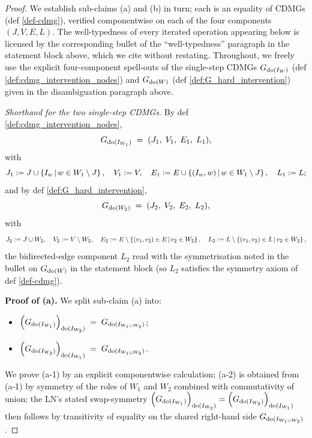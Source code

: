 \documentclass[main]{subfiles}
\begin{document}
\begin{proof}
We establish sub-claims (a) and (b) in turn; each is an equality of CDMGs (def \ref{def-cdmg}), verified componentwise on each of the four components $(J, V, E, L)$. The well-typedness of every iterated operation appearing below is licensed by the corresponding bullet of the ``well-typedness'' paragraph in the statement block above, which we cite without restating. Throughout, we freely use the explicit four-component spell-outs of the single-step CDMGs $G_{\operatorname{do}(I_W)}$ (def \ref{def:cdmg_intervention_nodes}) and $G_{\operatorname{do}(W)}$ (def \ref{def:G_hard_intervention}) given in the disambiguation paragraph above.

\smallskip\noindent\emph{Shorthand for the two single-step CDMGs.}
By def \ref{def:cdmg_intervention_nodes},
\[
    G_{\operatorname{do}(I_{W_1})} \;=\; (J_1,\; V_1,\; E_1,\; L_1),
\]
with
\[
    J_1 := J \cup \left \{ I_w \,\middle|\, w \in W_1 \setminus J \right \}, \quad V_1 := V, \quad E_1 := E \cup \left \{ (I_w, w) \,\middle|\, w \in W_1 \setminus J \right \}, \quad L_1 := L;
\]
and by def \ref{def:G_hard_intervention},
\[
    G_{\operatorname{do}(W_2)} \;=\; (J_2,\; V_2,\; E_2,\; L_2),
\]
with
\[
    J_2 := J \cup W_2, \quad V_2 := V \setminus W_2, \quad E_2 := E \setminus \left \{ (v_1, v_2) \in E \,\middle|\, v_2 \in W_2 \right \}, \quad L_2 := L \setminus \left \{ (v_1, v_2) \in L \,\middle|\, v_2 \in W_2 \right \},
\]
the bidirected-edge component $L_2$ read with the symmetrisation noted in the bullet on $G_{\operatorname{do}(W)}$ in the statement block (so $L_2$ satisfies the symmetry axiom of def \ref{def-cdmg}).

\medskip\noindent\textbf{Proof of (a).}
We split sub-claim (a) into:
\begin{itemize}
    \item[(a-1)] $\left ( G_{\operatorname{do}(I_{W_1})} \right )_{\operatorname{do}(I_{W_2})} \;=\; G_{\operatorname{do}(I_{W_1 \cup W_2})}$;
    \item[(a-2)] $\left ( G_{\operatorname{do}(I_{W_2})} \right )_{\operatorname{do}(I_{W_1})} \;=\; G_{\operatorname{do}(I_{W_1 \cup W_2})}$.
\end{itemize}
We prove (a-1) by an explicit componentwise calculation; (a-2) is obtained from (a-1) by symmetry of the roles of $W_1$ and $W_2$ combined with commutativity of union; the LN's stated swap-symmetry $\left ( G_{\operatorname{do}(I_{W_1})} \right )_{\operatorname{do}(I_{W_2})} = \left ( G_{\operatorname{do}(I_{W_2})} \right )_{\operatorname{do}(I_{W_1})}$ then follows by transitivity of equality on the shared right-hand side $G_{\operatorname{do}(I_{W_1 \cup W_2})}$.


\end{proof}
\end{document}
